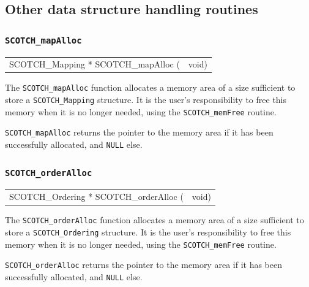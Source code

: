 \subsection{Other data structure handling routines}
\label{sec-lib-other}

\subsubsection{{\tt SCOTCH\_mapAlloc}}

\begin{itemize}
\progsyn

{\tt\begin{tabular}{l@{}l}
SCOTCH\_Mapping * SCOTCH\_mapAlloc ( & void)
\end{tabular}}

\progdes

The {\tt SCOTCH\_mapAlloc} function allocates a memory area of a
size sufficient to store a {\tt SCOTCH\_\lbt Mapping} structure. It is
the user's responsibility to free this memory when it is no longer
needed, using the {\tt SCOTCH\_\lbt mem\lbt Free} routine.

\progret

{\tt SCOTCH\_mapAlloc} returns the pointer to the memory area if it
has been successfully allocated, and {\tt NULL} else.
\end{itemize}

\subsubsection{{\tt SCOTCH\_orderAlloc}}

\begin{itemize}
\progsyn

{\tt\begin{tabular}{l@{}l}
SCOTCH\_Ordering * SCOTCH\_orderAlloc ( & void)
\end{tabular}}

\progdes

The {\tt SCOTCH\_orderAlloc} function allocates a memory area of a
size sufficient to store a {\tt SCOTCH\_\lbt Ordering} structure. It is
the user's responsibility to free this memory when it is no longer
needed, using the {\tt SCOTCH\_\lbt mem\lbt Free} routine.

\progret

{\tt SCOTCH\_orderAlloc} returns the pointer to the memory area if it
has been successfully allocated, and {\tt NULL} else.
\end{itemize}

